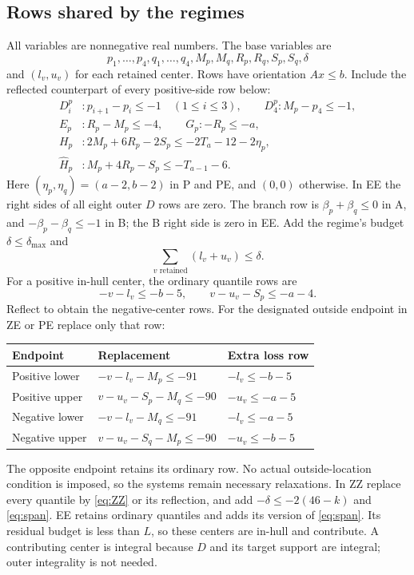\documentclass[11pt,a4paper]{article}
\begin{document}
\subsection{Rows shared by the regimes}
All variables are nonnegative real numbers. The base variables are
\[
 p_1,\ldots,p_4,q_1,\ldots,q_4,M_p,M_q,R_p,R_q,S_p,S_q,\delta
\]
and $(l_v,u_v)$ for each retained center. Rows have orientation $Ax\le b$.
Include the reflected counterpart of every positive-side row below:
\begin{align*}
 D_i^p &:p_{i+1}-p_i\le-1\quad(1\le i\le3),\qquad
 D_4^p :M_p-p_4\le-1,\\
 E_p &:R_p-M_p\le-4,\qquad G_p :-R_p\le-a,\\
 H_p &:2M_p+6R_p-2S_p\le-2T_a-12-2\eta_p,\\
 \widehat H_p &:M_p+4R_p-S_p\le-T_{a-1}-6.
\end{align*}
Here $(\eta_p,\eta_q)=(a-2,b-2)$ in P and PE, and $(0,0)$ otherwise.
In EE the right sides of all eight outer $D$ rows are zero.
The branch row is $\beta_p+\beta_q\le0$ in A, and
$-\beta_p-\beta_q\le-1$ in B; the B right side is zero in EE.
Add the regime's budget $\delta\le\delta_{\max}$ and
\begin{equation}\label{eq:loss}
 \sum_{v\text{ retained}}(l_v+u_v)\le\delta.
\end{equation}
For a positive in-hull center, the ordinary quantile rows are
\[
 -v-l_v\le-b-5,\qquad v-u_v-S_p\le-a-4.
\]
Reflect to obtain the negative-center rows.
For the designated outside endpoint in ZE or PE replace only that row:
\begin{center}\small
\begin{tabular}{lll}
\toprule
Endpoint&Replacement&Extra loss row\\
\midrule
Positive lower&$-v-l_v-M_p\le-91$&$-l_v\le-b-5$\\
Positive upper&$v-u_v-S_p-M_q\le-90$&$-u_v\le-a-5$\\
Negative lower&$-v-l_v-M_q\le-91$&$-l_v\le-a-5$\\
Negative upper&$v-u_v-S_q-M_p\le-90$&$-u_v\le-b-5$\\
\bottomrule
\end{tabular}
\end{center}
The opposite endpoint retains its ordinary row. No actual outside-location
condition is imposed, so the systems remain necessary relaxations.
In ZZ replace every quantile by \eqref{eq:ZZ} or its reflection, and add
$-\delta\le-2(46-k)$ and \eqref{eq:span}. EE retains ordinary quantiles
and adds its version of \eqref{eq:span}. Its residual budget is less than
$L$, so these centers are in-hull and contribute. A contributing center
is integral because $D$ and its target support are integral; outer
integrality is not needed.
\end{document}
